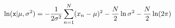 $$\ln ({\tt x}|\mu, \sigma^{2})=-\frac{1}{2\sigma^2}\sum_{n=1}^{N}(x_n - \mu)^2 - \frac{N}{2}\ln \sigma^2 - \frac{N}{2} \ln (2\pi)$$

